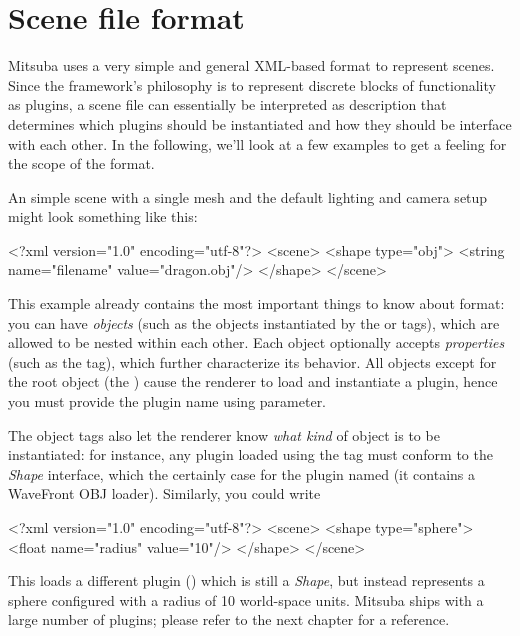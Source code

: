 \section{Scene file format}
Mitsuba uses a very simple and general XML-based format to represent scenes.  
Since the framework's philosophy is to represent discrete blocks of functionality as plugins, 
a scene file can essentially be interpreted as description that determines which 
plugins should be instantiated and how they should be interface with each other.
In the following, we'll look at a few examples to get a feeling for the scope of the
format.

An simple scene with a single mesh and the default lighting and camera setup might look
something like this:
\begin{xml}
<?xml version="1.0" encoding="utf-8"?>
<scene>
	<shape type="obj">
		<string name="filename" value="dragon.obj"/>
	</shape>
</scene>
\end{xml}
This example already contains the most important things to know about format: you can have
\emph{objects} (such as the objects instantiated by the  or  tags), which are allowed to be nested within
each other. Each object optionally accepts \emph{properties} (such as the  tag),
which further characterize its behavior. All objects except for the root object (the )
cause the renderer to load and instantiate a plugin, hence you must provide the plugin name using
 parameter. 

The object tags also let the renderer know \emph{what kind} of object is to be instantiated: for instance, 
any plugin loaded using the  tag must conform to the \emph{Shape} interface, which
the certainly case for the plugin named  (it contains a WaveFront OBJ loader).
Similarly, you could write
\begin{xml}
<?xml version="1.0" encoding="utf-8"?>
<scene>
	<shape type="sphere">
		<float name="radius" value="10"/>
	</shape>
</scene>
\end{xml}
This loads a different plugin () which is still a \emph{Shape}, but instead represents 
a sphere configured with a radius of 10 world-space units. Mitsuba ships with 
a large number of plugins; please refer to the next chapter for a reference.

